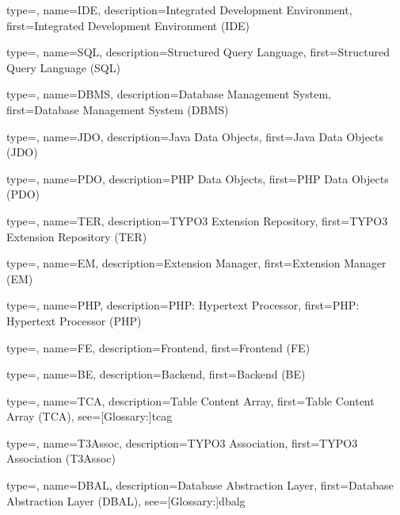 
{
	type=\acronymtype,
	name={IDE},
	description={Integrated Development Environment},
	first={Integrated Development Environment (IDE)}
}

{
	type=\acronymtype,
	name={SQL},
	description={Structured Query Language},
	first={Structured Query Language (SQL)}
}

{
	type=\acronymtype,
	name={DBMS},
	description={Database Management System},
	first={Database Management System (DBMS)}
}

{
	type=\acronymtype,
	name={JDO},
	description={Java Data Objects},
	first={Java Data Objects (JDO)}
}

{
	type=\acronymtype,
	name={PDO},
	description={PHP Data Objects},
	first={PHP Data Objects (PDO)}
}

{
	type=\acronymtype,
	name={TER},
	description={TYPO3 Extension Repository},
	first={TYPO3 Extension Repository (TER)}
}

{
	type=\acronymtype,
	name={EM},
	description={Extension Manager},
	first={Extension Manager (EM)}
}

{
	type=\acronymtype,
	name={PHP},
	description={PHP: Hypertext Processor},
	first={PHP: Hypertext Processor (PHP)}
}

{
	type=\acronymtype,
	name={FE},
	description={Frontend},
	first={Frontend (FE)}
}

{
	type=\acronymtype,
	name={BE},
	description={Backend},
	first={Backend (BE)}
}

{
	type=\acronymtype,
	name={TCA},
	description={Table Content Array},
	first={Table Content Array (TCA)},
	see=[Glossary:]{tcag}
}

{
	type=\acronymtype,
	name={T3Assoc},
	description={TYPO3 Association},
	first={TYPO3 Association (T3Assoc)}
}

{
	type=\acronymtype,
	name={DBAL},
	description={Database Abstraction Layer},
	first={Database Abstraction Layer (DBAL)},
	see=[Glossary:]{dbalg}
}

